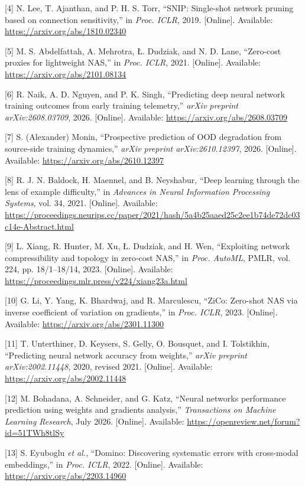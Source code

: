 [4]  N. Lee, T. Ajanthan, and P. H. S. Torr, ``SNIP: Single-shot network pruning based on connection sensitivity,'' in \emph{Proc. ICLR}, 2019. [Online]. Available: \url{https://arxiv.org/abs/1810.02340}

[5]  M. S. Abdelfattah, A. Mehrotra, \L{}. Dudziak, and N. D. Lane, ``Zero-cost proxies for lightweight NAS,'' in \emph{Proc. ICLR}, 2021. [Online]. Available: \url{https://arxiv.org/abs/2101.08134}

[6]  R. Naik, A. D. Nguyen, and P. K. Singh, ``Predicting deep neural network training outcomes from early training telemetry,'' \emph{arXiv preprint arXiv:2608.03709}, 2026. [Online]. Available: \url{https://arxiv.org/abs/2608.03709}

[7]  S. (Alexander) Monin, ``Prospective prediction of OOD degradation from source-side training dynamics,'' \emph{arXiv preprint arXiv:2610.12397}, 2026. [Online]. Available: \url{https://arxiv.org/abs/2610.12397}

[8]  R. J. N. Baldock, H. Maennel, and B. Neyshabur, ``Deep learning through the lens of example difficulty,'' in \emph{Advances in Neural Information Processing Systems}, vol. 34, 2021. [Online]. Available: \url{https://proceedings.neurips.cc/paper/2021/hash/5a4b25aaed25c2ee1b74de72dc03c14e-Abstract.html}

[9]  L. Xiang, R. Hunter, M. Xu, \L{}. Dudziak, and H. Wen, ``Exploiting network compressibility and topology in zero-cost NAS,'' in \emph{Proc. AutoML}, PMLR, vol. 224, pp. 18/1--18/14, 2023. [Online]. Available: \url{https://proceedings.mlr.press/v224/xiang23a.html}

[10]  G. Li, Y. Yang, K. Bhardwaj, and R. Marculescu, ``ZiCo: Zero-shot NAS via inverse coefficient of variation on gradients,'' in \emph{Proc. ICLR}, 2023. [Online]. Available: \url{https://arxiv.org/abs/2301.11300}

[11]  T. Unterthiner, D. Keysers, S. Gelly, O. Bousquet, and I. Tolstikhin, ``Predicting neural network accuracy from weights,'' \emph{arXiv preprint arXiv:2002.11448}, 2020, revised 2021. [Online]. Available: \url{https://arxiv.org/abs/2002.11448}

[12]  M. Bohadana, A. Schneider, and G. Katz, ``Neural networks performance prediction using weights and gradients analysis,'' \emph{Transactions on Machine Learning Research}, July 2026. [Online]. Available: \url{https://openreview.net/forum?id=51TWh8tlSy}

[13]  S. Eyuboglu \emph{et al.}, ``Domino: Discovering systematic errors with cross-modal embeddings,'' in \emph{Proc. ICLR}, 2022. [Online]. Available: \url{https://arxiv.org/abs/2203.14960}


